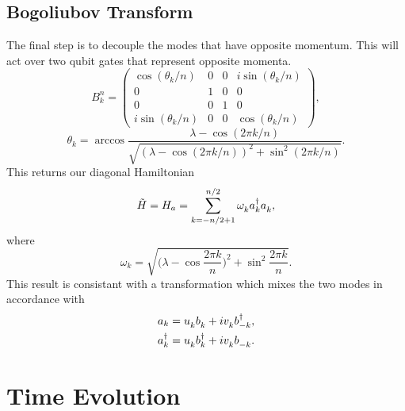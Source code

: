 \documentclass[12pt]{article}
\newcommand*{\iu}{i}
\begin{document}
  \subsection{Bogoliubov Transform}
  The final step is to decouple the modes that have opposite momentum. This will act over two qubit gates that represent opposite momenta.
  \begin{equation}
    B_{k}^{n}
      = \begin{pmatrix}
              \cos(\theta_{k} / n) & 0 & 0 & \iu \sin(\theta_{k} / n) \\
                                 0 & 1 & 0 &                        0 \\
                                 0 & 0 & 1 &                        0 \\
          \iu \sin(\theta_{k} / n) & 0 & 0 &     \cos(\theta_{k} / n)
      \end{pmatrix},
  \end{equation}
  \begin{equation}
    \theta_{k}
      = \arccos
        \frac{\lambda - \cos(2 \pi k / n)}
             {\sqrt{(\lambda - \cos(2 \pi k / n))^{2} + \sin^{2}(2 \pi k / n)}}.
  \end{equation}
  This returns our diagonal Hamiltonian
    \begin{equation}
      \tilde{H}
        = H_{a}
        = \sum_{k = -n / 2 + 1}^{n / 2}
          \omega_{k}^{\vphantom{\dagger}} a_{k}^{\dagger}
          a_{k}^{\vphantom{\dagger}},
    \end{equation}
    where
    \begin{equation}
      \omega_{k}
        = \sqrt{\biggl( \lambda - \cos \frac{2\pi k}{n} \biggr)^{2}
                + \sin^{2} \frac{2\pi k}{n}}.
    \end{equation}
    This result is consistant with a transformation which mixes the two modes in accordance with
    \begin{subequations}
      \begin{align}
        a_{k}
          &= u_{k}^{\vphantom{\dagger}} b_{k}^{\vphantom{\dagger}}
             + \iu v_{k}^{\vphantom{\dagger}} b_{-k}^{\dagger}, \\
        a_{k}^{\dagger}
          &= u_{k}^{\vphantom{\dagger}} b_{k}^{\dagger}
             + \iu v_{k}^{\vphantom{\dagger}} b_{-k}^{\vphantom{\dagger}}.
      \end{align}
    \end{subequations}

  \section{Time Evolution}
  \blindtext
\end{document}
